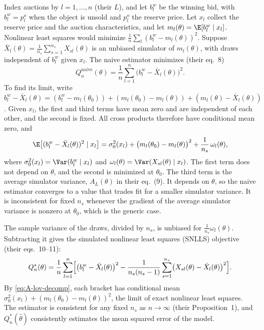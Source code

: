 Index auctions by $l = 1, \dots, n$ (their $L$), and let $b^w_l$ be the winning bid, with $b^w_l = p^o_l$ when the
object is unsold and $p^o_l$ the reserve price. Let $x_l$ collect the reserve price and the auction characteristics,
and let $m_l(\theta) = \E[b^w_l \mid x_l]$. Nonlinear least squares would minimize $\frac{1}{n}\sum_l(b^w_l -
m_l(\theta))^2$. Suppose $\bar X_l(\theta) = \frac{1}{n_s}\sum_{s=1}^{n_s}X_{sl}(\theta)$ is an unbiased simulator of
$m_l(\theta)$, with draws independent of $b^w_l$ given $x_l$. The naive estimator minimizes (their eq.~8)
\begin{equation}\label{eq:A-lov-naive}
  Q^{\text{naive}}_n(\theta) = \frac{1}{n}\sum_{l=1}^{n}\bigl(b^w_l - \bar X_l(\theta)\bigr)^2.
\end{equation}
To find its limit, write $b^w_l - \bar X_l(\theta) = (b^w_l - m_l(\theta_0)) + (m_l(\theta_0) - m_l(\theta)) +
(m_l(\theta) - \bar X_l(\theta))$. Given $x_l$, the first and third terms have mean zero and are independent of
each other, and the second is fixed. All cross products therefore have conditional mean zero, and
\begin{equation}\label{eq:A-lov-decomp}
  \E\bigl[(b^w_l - \bar X_l(\theta))^2 \mid x_l\bigr] = \sigma_0^2(x_l) + \bigl(m_l(\theta_0) - m_l(\theta)\bigr)^2
  + \frac{1}{n_s}\,\omega_l(\theta),
\end{equation}
where $\sigma_0^2(x_l) = \Var(b^w_l \mid x_l)$ and $\omega_l(\theta) = \Var(X_{sl}(\theta) \mid x_l)$. The first term
does not depend on $\theta$, and the second is minimized at $\theta_0$. The third term is the average simulator
variance, $A_L(\theta)$ in their eq.~(9). It depends on $\theta$, so the naive estimator converges to a value that
trades fit for a smaller simulator variance. It is inconsistent for fixed $n_s$ whenever the gradient of the
average simulator variance is nonzero at $\theta_0$, which is the generic case.

The sample variance of the draws, divided by $n_s$, is unbiased for $\frac{1}{n_s}\omega_l(\theta)$. Subtracting it
gives the simulated nonlinear least squares (SNLLS) objective (their eqs.~10--11):
\begin{equation}\label{eq:A-lov-snlls}
  Q^*_n(\theta) = \frac{1}{n}\sum_{l=1}^{n}\Bigl[\bigl(b^w_l - \bar X_l(\theta)\bigr)^2
  - \frac{1}{n_s(n_s - 1)}\sum_{s=1}^{n_s}\bigl(X_{sl}(\theta) - \bar X_l(\theta)\bigr)^2\Bigr].
\end{equation}
By \eqref{eq:A-lov-decomp}, each bracket has conditional mean $\sigma_0^2(x_l) + (m_l(\theta_0) - m_l(\theta))^2$, the
limit of exact nonlinear least squares. The estimator is consistent for any fixed $n_s$ as $n \to \infty$ (their
Proposition~1), and $Q^*_n(\hat\theta)$ consistently estimates the mean squared error of the model.

